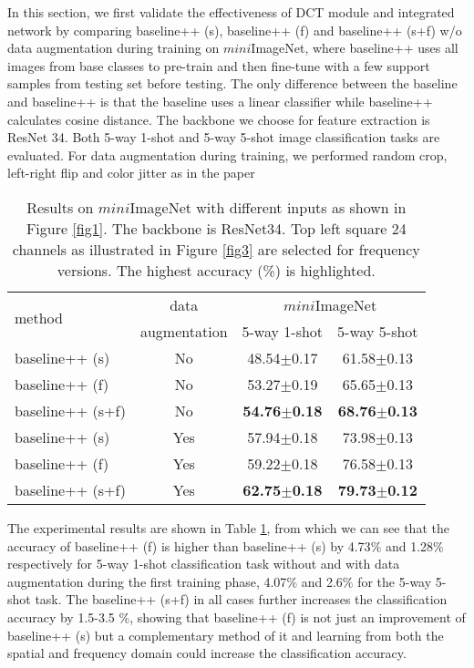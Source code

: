 \documentclass[10pt, conference, compsocconf]{IEEEtran}
\begin{document}
In this section, we first validate the effectiveness of DCT module and integrated network by comparing baseline++ (s), baseline++ (f) and baseline++ (s+f) w/o data augmentation during training on $\textit{mini}$ImageNet, where baseline++ \cite{chen2019closer} uses all images from base classes to pre-train and then fine-tune with a few support samples from testing set before testing. The only difference between the baseline \cite{qi2018low} and baseline++ is that the baseline uses a linear classifier while baseline++ calculates cosine distance. The backbone we choose for feature extraction is ResNet 34. Both 5-way 1-shot and 5-way 5-shot image classification tasks are evaluated. {}{For data augmentation during training, we performed random crop, left-right flip and color jitter as in the paper \cite{chen2019closer}}

\begin{table}[pb]
\centering
\caption{Results on $\textit{mini}$ImageNet with different inputs as shown in Figure \ref{fig1}. The backbone is ResNet34. Top left square 24 channels {}{as illustrated in Figure \ref{fig3}} are selected for frequency versions. The highest accuracy (\%) is highlighted.}
\begin{tabular}{l|c|cc}
\toprule
\multirow{2}{*}{method} & {}{data} & \multicolumn{2}{c}{$\textit{mini}$ImageNet} \\
&{}{augmentation} &5-way 1-shot& 5-way 5-shot\\ \hline
baseline++ (s) & {}{No} & 48.54$\pm$0.17 & 61.58$\pm$0.13 \\
baseline++ (f) & {}{No} & 53.27$\pm$0.19 & 65.65$\pm$0.13 \\
baseline++ (s+f) & {}{No} & {}{\bf{54.76$\pm$0.18}} & {}{\bf{68.76$\pm$0.13}} \\\hline
baseline++ (s) & {}{Yes} & 57.94$\pm$0.18 & 73.98$\pm$0.13 \\
baseline++ (f) & {}{Yes} & 59.22$\pm$0.18 & 76.58$\pm$0.13 \\
baseline++ (s+f) & {}{Yes} & {}{\bf{62.75$\pm$0.18}} & {}{\bf{79.73$\pm$0.12}} \\
\bottomrule
\end{tabular}
\label{table1}
\end{table}

The experimental results are shown in Table \ref{table1}, from which we can see that the accuracy of baseline++ (f) is higher than baseline++ (s) by 4.73$\%$ and 1.28$\%$ respectively for 5-way 1-shot classification task without and with data augmentation during the first training phase, 4.07$\%$ and 2.6$\%$ for the 5-way 5-shot task. The baseline++ (s+f) in {}{all} cases further increases the classification accuracy by 1.5-3.5 $\%$, showing that baseline++ (f) is not just an improvement of  baseline++ (s) but a complementary method of it and learning from both the spatial and frequency domain could increase the classification accuracy.
\end{document}
